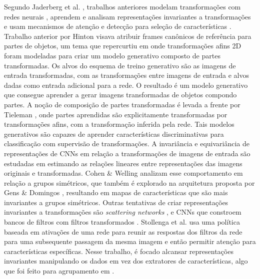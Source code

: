 \documentclass[conference]{IEEEtran}
\begin{document}
Segundo Jaderberg et al. \cite{jaderberg2015spatial}, trabalhos anteriores modelam transformações com redes neurais \cite{hinton1981parallel,hinton2011transforming,tieleman2014optimizing}, aprendem e analisam representações invariantes a transformações \cite{bruna2013invariant,cohen2014transformation,gens2014deep,kanazawa2014locally,lenc2015understanding,sohn2012learning} e usam mecanismos de atenção e detecção para seleção de características \cite{ba2014multiple,erhan2014scalable,girshick2014rich,gregor2015draw,schmidhuber1991learning,sermanet2014attention}.
Trabalho anterior por Hinton \cite{hinton1981parallel} visava atribuir frames canônicos de referência para partes de objetos, um tema que repercurtiu em \cite{hinton2011transforming} onde transformações afins 2D foram modeladas para criar um modelo generativo composto de partes transformadas. Os alvos do esquema de treino generativo são as imagens de entrada transformadas, com as transformações entre imagens de entrada e alvos dadas como entrada adicional para a rede. O resultado é um modelo generativo que consegue aprender a gerar imagens transformadas de objetos compondo partes. A noção de composição de partes transformadas é levada a frente por Tieleman \cite{tieleman2014optimizing}, onde partes aprendidas são explicitamente transformadas por transformações afins, com a transformação inferida pela rede. Tais modelos generativos são capazes de aprender características discriminativas para classificação com supervisão de transformações.
A invariância e equivariância de representações de CNNs em relação a transformações de imagens de entrada são estudadas em \cite{lenc2015understanding} estimando as relações lineares entre representações das imagens originais e transformadas. Cohen & Welling \cite{cohen2014transformation} analizam esse comportamento em relação a grupos simétricos, que também é explorado na arquitetura proposta por Gens & Domingos \cite{gens2014deep}, resultando em mapas de características que são mais invariantes a grupos simétricos. Outras tentativas de criar representações invariantes a transformações são \textit{scattering networks} \cite{bruna2013invariant}, e CNNs que constroem bancos de filtros com filtros transformados \cite{kanazawa2014locally,sohn2012learning}.
Stollenga et al. \cite{stollenga2014deep} usa uma política baseada em ativações de uma rede para reunir as respostas dos filtros da rede para uma subsequente passagem da mesma imagem e então permitir atenção para características específicas. Nesse trabalho, é focado alcansar representações invariantes manipulando os dados em vez dos extratores de características, algo que foi feito para agrupamento em \cite{frey2002fast}.
\end{document}

